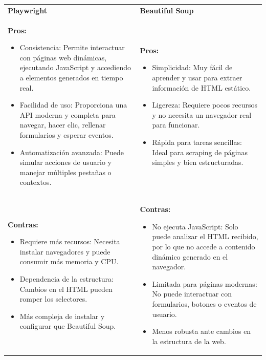 \documentclass{article}
\begin{document}
\begin{enumerate}
    \begin{tabular}{p{7cm} p{7cm}}
    \textbf{Playwright} & \textbf{Beautiful Soup} \\
    \textbf{Pros:}
    \begin{itemize}
        \item Consistencia: Permite interactuar con páginas web dinámicas, ejecutando JavaScript y accediendo a elementos generados en tiempo real.
        \item Facilidad de uso: Proporciona una API moderna y completa para navegar, hacer clic, rellenar formularios y esperar eventos.
        \item Automatización avanzada: Puede simular acciones de usuario y manejar múltiples pestañas o contextos.
    \end{itemize}
    &
    \textbf{Pros:}
    \begin{itemize}
        \item Simplicidad: Muy fácil de aprender y usar para extraer información de HTML estático.
        \item Ligereza: Requiere pocos recursos y no necesita un navegador real para funcionar.
        \item Rápida para tareas sencillas: Ideal para scraping de páginas simples y bien estructuradas.
    \end{itemize}
    \\
    \textbf{Contras:}
    \begin{itemize}
        \item Requiere más recursos: Necesita instalar navegadores y puede consumir más memoria y CPU.
        \item Dependencia de la estructura: Cambios en el HTML pueden romper los selectores.
        \item Más compleja de instalar y configurar que Beautiful Soup.
    \end{itemize}
    &
    \textbf{Contras:}
    \begin{itemize}
        \item No ejecuta JavaScript: Solo puede analizar el HTML recibido, por lo que no accede a contenido dinámico generado en el navegador.
        \item Limitada para páginas modernas: No puede interactuar con formularios, botones o eventos de usuario.
        \item Menos robusta ante cambios en la estructura de la web.
    \end{itemize}
    \\
    \end{tabular}
    

\end{enumerate}
\end{document}
